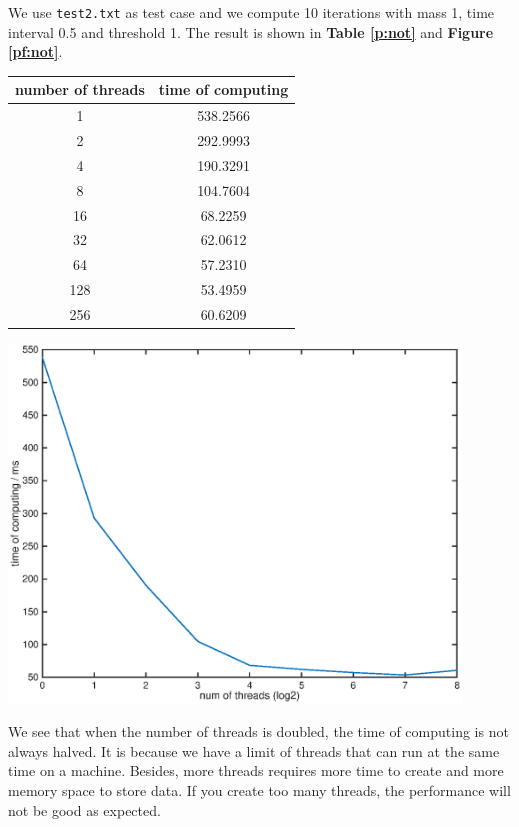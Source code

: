 \documentclass[11pt, a4paper]{article}
\makeatletter
\newcommand\fcaption{\def\@captype{figure}\caption}
\newcommand\tcaption{\def\@captype{table}\caption}
\newcommand{\fref}[1]{\textbf{Figure \ref{#1}}}
\newcommand{\tref}[1]{\textbf{Table \ref{#1}}}
\makeatother
\begin{document}
We use \texttt{test2.txt} as test case and we compute 10 iterations with mass 1, time interval 0.5 and threshold 1. The result is shown in \tref{p:not} and \fref{pf:not}. 

\begin{center}
    \tcaption{Performance on different number of threads}\label{p:not}
    \begin{tabular}{cc}
        \toprule
        number of threads & time of computing \\
        \midrule
        1 & 538.2566 \\ 
        2 & 292.9993 \\ 
        4 & 190.3291 \\ 
        8 & 104.7604 \\ 
        16 & 68.2259 \\ 
        32 & 62.0612 \\ 
        64 & 57.2310 \\ 
        128 & 53.4959 \\ 
        256 & 60.6209 \\ 
        \bottomrule
    \end{tabular}
\end{center}

\begin{center}
    \includegraphics[width=12cm]{not}
    \fcaption{Performance on different number of threads}\label{pf:not}
\end{center}

We see that when the number of threads is doubled, the time of computing is not always halved. It is because we have a limit of threads that can run at the same time on a machine. Besides, more threads requires more time to create and more memory space to store data. If you create too many threads, the performance will not be good as expected.
\end{document}
